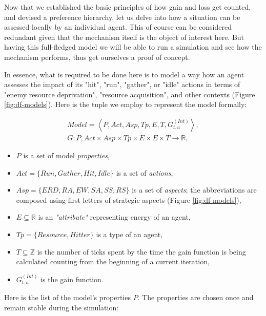 Now that we established the basic principles of how gain and loss get counted, and devised a preference hierarchy, let
us delve into how a situation can be assessed locally by an individual agent. This of course can be considered redundant
given that the mechanism itself is the object of interest here. But having this full-fledged
model we will be able to run a simulation and see how the mechanism performs, thus get ourselves a proof of concept.

In essence, what is required to be done here is to model a way how an agent assesses the impact of its "hit", "run",
"gather", or "idle" actions in terms of "enemy resource deprivation", "resource acquisition", and other contexts (Figure
\ref{fig:df-models}). Here is the tuple we employ to represent the model formally:

\begin{equation}
    \begin{gathered}
        Model = \left< P, Act, Asp, Tp, E, T, G_{t, a}^{(Int)} \right>,\\
        G: P, Act \times Asp \times Tp \times E \times E \times T \rightarrow \mathbb{R},
    \end{gathered}
\end{equation}

\begin{itemize}
    \item $P$ is a set of model \textit{properties},
    \item $Act = \{Run, Gather, Hit, Idle\}$ is a set of \textit{actions},
    \item $Asp = \{ ERD, RA, EW, SA, SS, RS \}$ is a set of \textit{aspects}; the abbreviations are composed using first letters of strategic aspects (Figure \ref{fig:df-models}),
    \item $E \subseteq \mathbb{R}$ is an \textit{"attribute"} representing energy of an agent,
    \item $Tp = \{Resource, Hitter \}$ is a type of an agent,
    \item $T \subseteq \mathbb{Z}$ is the number of ticks spent by the time the gain function is being calculated counting from the beginning of a current iteration,
    \item $G_{t, a}^{(Int)}$ is the gain function.
\end{itemize}

Here is the list of the model's properties $P$. The properties are chosen once and remain stable during the simulation:

